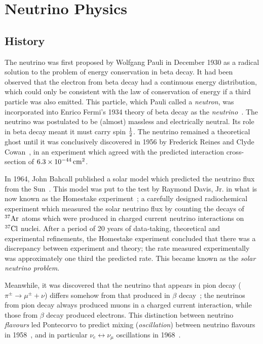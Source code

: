 \chapter{Neutrino Physics}\label{chapter:NeutrinoPhysics}

\section{History}
The neutrino was first proposed by Wolfgang Pauli in December 1930 as a radical solution to the problem of energy conservation in beta decay. It had been observed that the electron from beta decay had a continuous energy distribution, which could only be consistent with the law of conservation of energy if a third particle was also emitted. This particle, which Pauli called a \emph{neutron}, was incorporated into Enrico Fermi's 1934 theory of beta decay as the \emph{neutrino}~\citep{Fermi1934,Wilson1968}. The neutrino was postulated to be (almost) massless and electrically neutral. Its role in beta decay meant it must carry spin $\frac{1}{2}$. The neutrino remained a theoretical ghost until it was conclusively discovered in 1956 by Frederick Reines and Clyde Cowan~\citep{Reines1956}, in an experiment which agreed with the predicted interaction cross-section of $6.3\times 10^{-44} \,\mathrm{cm}^2$.

In 1964, John Bahcall published a solar model which predicted the neutrino flux from the Sun~\citep{Bahcall1964}. This model was put to the test by Raymond Davis, Jr. in what is now known as the Homestake experiment~\citep{Davis1964}; a carefully designed radiochemical experiment which measured the solar neutrino flux by counting the decays of $^{37}\mathrm{Ar}$ atoms which were produced in charged current neutrino interactions on $^{37}\mathrm{Cl}$ nuclei. After a period of 20 years of data-taking, theoretical and experimental refinements, the Homestake experiment concluded that there was a discrepancy between experiment and theory; the rate measured experimentally was approximately one third the predicted rate. This became known as the \emph{solar neutrino problem}.

Meanwhile, it was discovered that the neutrino that appears in pion decay ($\pi^\pm \rightarrow \mu^\pm + \nu$) differs somehow from that produced in $\beta$ decay~\citep{Danby1962}; the neutrinos from pion decay always produced muons in a charged current interaction, while those from $\beta$ decay produced electrons. This distinction between neutrino \emph{flavours} led Pontecorvo to predict mixing (\emph{oscillation}) between neutrino flavours in 1958~\citep{Pontecorvo1958}, and in particular $\nu_e \leftrightarrow \nu_\mu$ oscillations in 1968~\citep{Pontecorvo1968}.

